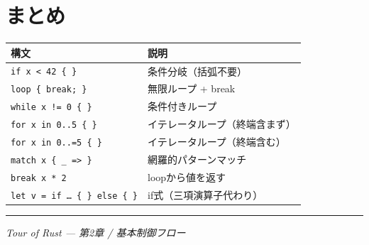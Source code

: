 \documentclass[12pt,a4paper]{article}
\begin{document}
\section*{まとめ}

\begin{center}
\begin{tabular}{ll}
\toprule
\textbf{構文} & \textbf{説明} \\
\midrule
\texttt{if x < 42 \{ \}} & 条件分岐（括弧不要）\\
\texttt{loop \{ break; \}} & 無限ループ + break \\
\texttt{while x != 0 \{ \}} & 条件付きループ \\
\texttt{for x in 0..5 \{ \}} & イテレータループ（終端含まず）\\
\texttt{for x in 0..=5 \{ \}} & イテレータループ（終端含む）\\
\texttt{match x \{ \_ => \}} & 網羅的パターンマッチ \\
\texttt{break x * 2} & loopから値を返す \\
\texttt{let v = if … \{ \} else \{ \}} & if式（三項演算子代わり）\\
\bottomrule
\end{tabular}
\end{center}

\vspace{6mm}
\hrule
\vspace{2mm}
{\small\color{gray}\textit{Tour of Rust — 第2章 / 基本制御フロー}}
\end{document}
